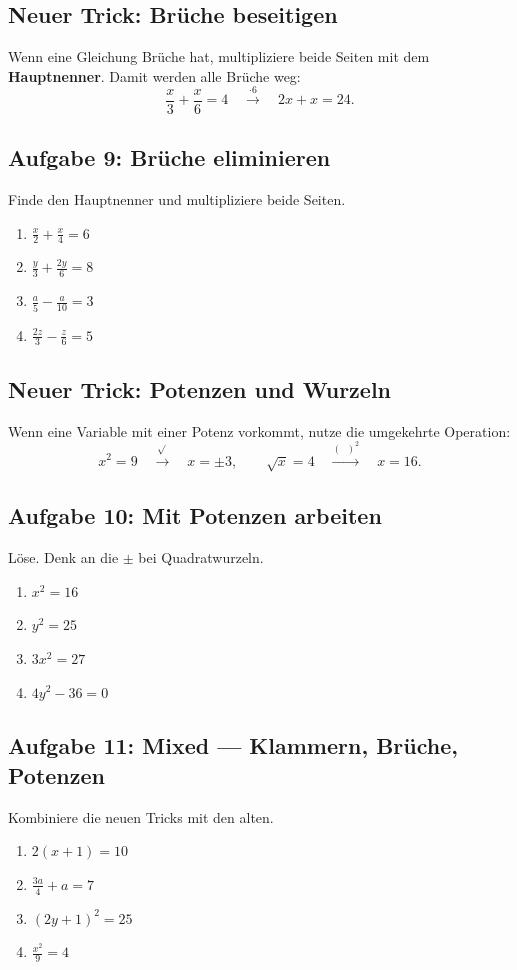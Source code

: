 \documentclass[12pt]{article}
\begin{document}
\subsection*{Neuer Trick: Brüche beseitigen}
Wenn eine Gleichung Brüche hat, multipliziere beide Seiten mit dem \textbf{Hauptnenner}. Damit werden alle Brüche weg:
\[
  \frac{x}{3} + \frac{x}{6} = 4 \quad \xrightarrow{\cdot 6} \quad 2x + x = 24.
\]

\subsection*{Aufgabe 9: Brüche eliminieren}
Finde den Hauptnenner und multipliziere beide Seiten.
\begin{enumerate}
  \item \(\frac{x}{2} + \frac{x}{4} = 6\)
  \item \(\frac{y}{3} + \frac{2y}{6} = 8\)
  \item \(\frac{a}{5} - \frac{a}{10} = 3\)
  \item \(\frac{2z}{3} - \frac{z}{6} = 5\)
\end{enumerate}

\subsection*{Neuer Trick: Potenzen und Wurzeln}
Wenn eine Variable mit einer Potenz vorkommt, nutze die umgekehrte Operation:
\[
  x^2 = 9 \quad \xrightarrow{\sqrt{}} \quad x = \pm 3, \qquad \sqrt{x} = 4 \quad \xrightarrow{(\phantom{x})^2} \quad x = 16.
\]

\subsection*{Aufgabe 10: Mit Potenzen arbeiten}
Löse. Denk an die \(\pm\) bei Quadratwurzeln.
\begin{enumerate}
  \item \(x^2 = 16\)
  \item \(y^2 = 25\)
  \item \(3x^2 = 27\)
  \item \(4y^2 - 36 = 0\)
\end{enumerate}

\subsection*{Aufgabe 11: Mixed — Klammern, Brüche, Potenzen}
Kombiniere die neuen Tricks mit den alten.
\begin{enumerate}
  \item \(2(x + 1) = 10\)
  \item \(\frac{3a}{4} + a = 7\)
  \item \((2y + 1)^2 = 25\)
  \item \(\frac{x^2}{9} = 4\)
\end{enumerate}
\end{document}
